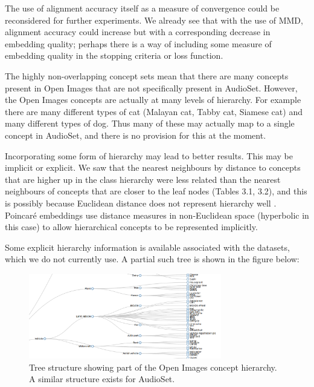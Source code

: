 The use of alignment accuracy itself as a measure of convergence could be reconsidered for further experiments. We already see that with the use of MMD, alignment accuracy could increase but with a corresponding decrease in embedding quality; perhaps there is a way of including some measure of embedding quality in the stopping criteria or loss function.  

The highly non-overlapping concept sets mean that there are many concepts present in Open Images that are not specifically present in AudioSet. However, the Open Images concepts are actually at many levels of hierarchy. For example there are many different types of cat (Malayan cat, Tabby cat, Siamese cat) and many different types of dog. Thus many of these may actually map to a single concept in AudioSet, and there is no provision for this at the moment. 

Incorporating some form of hierarchy may lead to better results. This may be implicit or explicit.   We saw that the nearest neighbours by distance to concepts that are higher up in the class hierarchy were less related than the nearest neighbours of concepts that are closer to the leaf nodes (Tables 3.1, 3.2), and this is possibly because Euclidean distance does not represent hierarchy well \cite{NNAnalysisPsychologicalSpaces}. Poincar{\'{e}} embeddings \cite{PoincareEmbeddings} use distance measures in non-Euclidean space (hyperbolic in this case) to allow hierarchical concepts to be represented implicitly.

Some explicit hierarchy information is available associated with the datasets, which we do not currently use. A partial such tree is shown in the figure below:

\begin{figure}[H]
\label{fig:tree}
    \centering
    \includegraphics[width=0.75\textwidth]{images/conclusions/tree.png}
    \caption{
        Tree structure showing part of the Open Images concept hierarchy. A similar structure exists for AudioSet.
    }
\end{figure}

